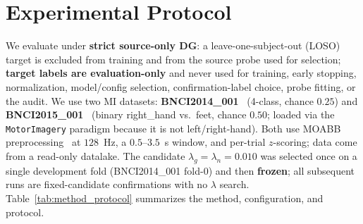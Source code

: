 \section{Experimental Protocol}

We evaluate under \textbf{strict source-only DG}: a leave-one-subject-out (LOSO) target is excluded from
training and from the source probe used for selection; \textbf{target labels are evaluation-only} and never
used for training, early stopping, normalization, model/config selection, confirmation-label choice, probe
fitting, or the audit. We use two MI datasets: \textbf{BNCI2014\_001}~\citep{tangermann2012review,
brunner2008graz2a} (4-class, chance $0.25$) and \textbf{BNCI2015\_001}~\citep{faller2012autocalibration}
(binary right\_hand vs.\ feet, chance $0.50$; loaded via the \texttt{MotorImagery} paradigm because it is
not left/right-hand). Both use MOABB preprocessing~\citep{jayaram2018moabb} at $128$~Hz, a $0.5$--$3.5$~s
window, and per-trial $z$-scoring; data come from a read-only datalake. The candidate
$\lambda_g = \lambda_n = 0.010$ was selected once on a single development fold (BNCI2014\_001 fold-0) and
then \textbf{frozen}; all subsequent runs are fixed-candidate confirmations with no $\lambda$ search.
Table~\ref{tab:method_protocol} summarizes the method, configuration, and protocol.


